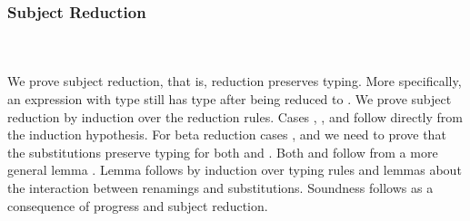 \subsubsection{Subject Reduction}\hfill\\\\
We prove subject reduction, that is, reduction preserves typing. More specifically, an expression  with type  still has type  after being reduced to . We prove subject reduction by induction over the reduction rules. 
\FSubjectReduction
Cases , ,  and  follow directly from the induction hypothesis. 
For beta reduction cases ,  and  we need to prove that the substitutions preserve typing for both  \Data{[}  \Data{]} and  \Data{[}  \Data{]}.
Both  and  follow from a more general lemma . 
\Fpreserves
Lemma  follows by induction over typing rules and lemmas about the interaction between renamings and substitutions. 
Soundness follows as a consequence of progress and subject reduction. 